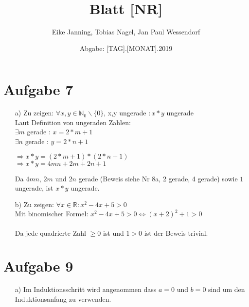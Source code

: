 \documentclass[paper = a4, ngerman]{scrartcl}
\title{Blatt [NR]}
\author{Eike Janning, Tobias Nagel, Jan Paul Wessendorf}
\date{Abgabe: [TAG].[MONAT].2019}
\begin{document}
	\maketitle
	\hrulefill
	
	\section*{Aufgabe 7}
		\begin{itemize}
			\item[a)] Zu zeigen: $\forall x,y \in \mathbb{N}_0 \backslash \{ 0 \}$, x,y ungerade $: x*y$ ungerade\\
			Laut Definition von ungeraden Zahlen:\\
			$\exists m$ gerade : $x = 2*m+1$\\
			$\exists n$ gerade : $y = 2*n+1$
			\begin{center}
				$\Rightarrow x*y = (2*m+1)*(2*n+1)$\\
				$\Rightarrow x*y = 4mn + 2m + 2n + 1$
			\end{center}
			Da $4mn$, $2m$ und $2n$ gerade (Beweis siehe Nr 8a, 2 gerade, 4 gerade) sowie $1$ ungerade, ist $x*y$ ungerade.
			
			\item[b)] Zu zeigen: $\forall x \in \mathbb{R} : x^2 - 4x + 5 > 0$\\
			Mit binomischer Formel: $x^2 - 4x + 5 > 0 \Leftrightarrow (x + 2)^2 + 1 > 0$\\\\
			Da jede quadrierte Zahl $\ge 0$ ist und $1 > 0$ ist der Beweis trivial.
		\end{itemize}
	
	
	\section*{Aufgabe 9}
		\begin{itemize}
			\item[a)] Im Induktionsschritt wird angenommen dass $a=0$ und $b=0$ sind um den Induktionsanfang zu verwenden.
		\end{itemize}
\end{document}
